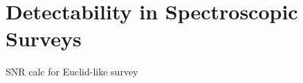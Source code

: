 \chapter{Detectability in Spectroscopic Surveys}
\label{chapter:snreuclid}

SNR calc for Euclid-like survey